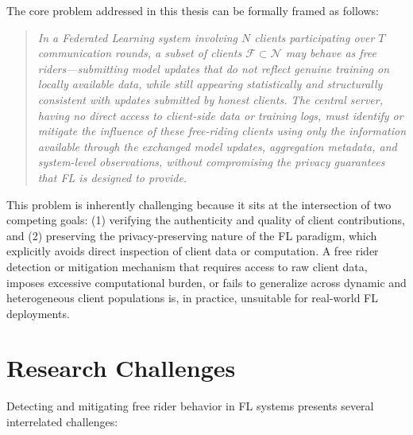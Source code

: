 The core problem addressed in this thesis can be formally framed as follows:

\begin{quote}
\textit{In a Federated Learning system involving $N$ clients participating over $T$ communication rounds, a subset of clients $\mathcal{F} \subset \mathcal{N}$ may behave as free riders—submitting model updates that do not reflect genuine training on locally available data, while still appearing statistically and structurally consistent with updates submitted by honest clients. The central server, having no direct access to client-side data or training logs, must identify or mitigate the influence of these free-riding clients using only the information available through the exchanged model updates, aggregation metadata, and system-level observations, without compromising the privacy guarantees that FL is designed to provide.}
\end{quote}

This problem is inherently challenging because it sits at the intersection of two competing goals: (1) verifying the authenticity and quality of client contributions, and (2) preserving the privacy-preserving nature of the FL paradigm, which explicitly avoids direct inspection of client data or computation. A free rider detection or mitigation mechanism that requires access to raw client data, imposes excessive computational burden, or fails to generalize across dynamic and heterogeneous client populations is, in practice, unsuitable for real-world FL deployments.

\section{Research Challenges}
\label{sec:research-challenges}

Detecting and mitigating free rider behavior in FL systems presents several interrelated challenges:

